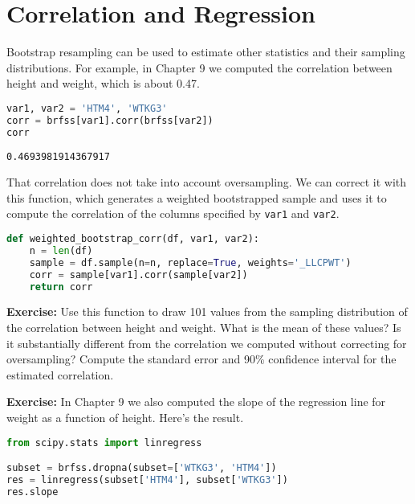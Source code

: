 \section{Correlation and Regression}\label{correlation-and-regression}

Bootstrap resampling can be used to estimate other statistics and their
sampling distributions. For example, in Chapter 9 we computed the
correlation between height and weight, which is about 0.47.

\begin{lstlisting}[language=Python,style=source]
var1, var2 = 'HTM4', 'WTKG3'
corr = brfss[var1].corr(brfss[var2])
corr
\end{lstlisting}

\begin{lstlisting}[style=output]
0.4693981914367917
\end{lstlisting}

That correlation does not take into account oversampling. We can correct
it with this function, which generates a weighted bootstrapped sample
and uses it to compute the correlation of the columns specified by
\passthrough{\lstinline!var1!} and \passthrough{\lstinline!var2!}.

\begin{lstlisting}[language=Python,style=source]
def weighted_bootstrap_corr(df, var1, var2):
    n = len(df)
    sample = df.sample(n=n, replace=True, weights='_LLCPWT')
    corr = sample[var1].corr(sample[var2])
    return corr
\end{lstlisting}

\textbf{Exercise:} Use this function to draw 101 values from the
sampling distribution of the correlation between height and weight. What
is the mean of these values? Is it substantially different from the
correlation we computed without correcting for oversampling? Compute the
standard error and 90\% confidence interval for the estimated
correlation.

\textbf{Exercise:} In Chapter 9 we also computed the slope of the
regression line for weight as a function of height. Here's the result.

\begin{lstlisting}[language=Python,style=source]
from scipy.stats import linregress

subset = brfss.dropna(subset=['WTKG3', 'HTM4'])
res = linregress(subset['HTM4'], subset['WTKG3'])
res.slope
\end{lstlisting}

